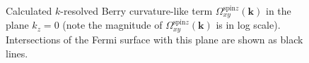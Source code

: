 \begin{figure}[htb!]
	\centering
	\qquad
	\caption{Calculated $k$-resolved Berry curvature-like term
		$\Omega_{xy}^{\text{spin}z}(\bm k)$ in the plane $k_z=0$
		(note the magnitude of $\Omega_{xy}^{\text{spin}z}(\bm k)$ is in log scale).
		Intersections of the Fermi surface
		with this plane are shown as black lines.}
	\label{fig29.2}
\end{figure}
